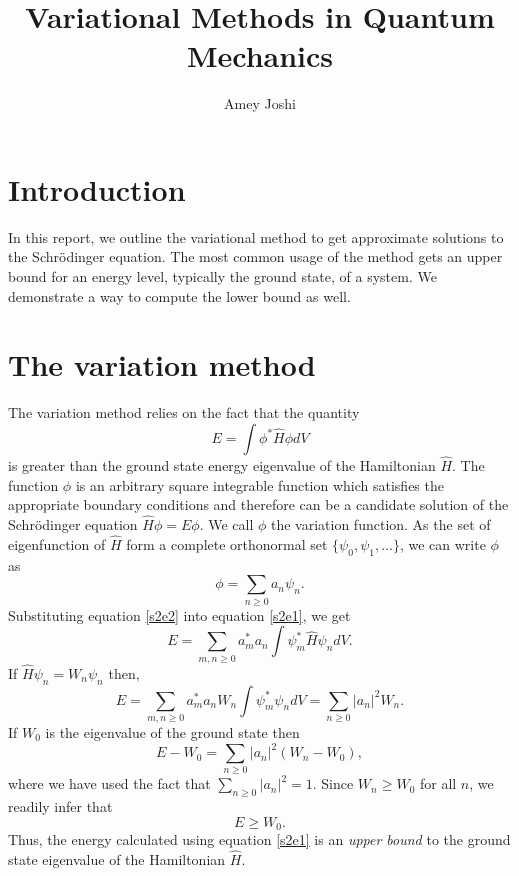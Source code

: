 \documentclass{article}
\numberwithin{equation}{section}
\begin{document}
\title{Variational Methods in Quantum Mechanics}
\author{Amey Joshi}
\maketitle
\section{Introduction}\label{s1}
In this report, we outline the variational method to get approximate 
solutions to the Schr\"{o}dinger equation. The most common usage of the
method gets an upper bound for an energy level, typically the ground 
state, of a system. We demonstrate a way to compute the lower bound as 
well.

\section{The variation method}\label{s2}
The variation method relies on the fact that the quantity
\begin{equation}\label{s2e1}
E = \int\phi^\ast\hat{H}\phi dV
\end{equation}
is greater than the ground state energy eigenvalue of the Hamiltonian 
$\hat{H}$. The function $\phi$ is an arbitrary square integrable function
which satisfies the appropriate boundary conditions and therefore can be 
a candidate solution of the Schr\"{o}dinger equation $\hat{H}\phi = E\phi$.
We call $\phi$ the variation function. As the set of eigenfunction of 
$\hat{H}$ form a complete orthonormal set $\{\psi_0, \psi_1, \ldots\}$, 
we can write $\phi$ as
\begin{equation}\label{s2e2}
\phi = \sum_{n \ge 0}a_n\psi_n.
\end{equation}
Substituting equation \eqref{s2e2} into equation \eqref{s2e1}, we get
\[
E = \sum_{m,n \ge 0}a_m^\ast a_n \int \psi_m^\ast \hat{H}\psi_n dV.
\]
If $\hat{H}\psi_n = W_n\psi_n$ then,
\[
E = \sum_{m,n \ge 0}a_m^\ast a_n W_n \int\psi_m^\ast\psi_n dV = 
\sum_{n \ge 0}|a_n|^2W_n.
\]
If $W_0$ is the eigenvalue of the ground state then
\begin{equation}\label{s2e3}
E - W_0 = \sum_{n \ge 0}|a_n|^2(W_n - W_0),
\end{equation}
where we have used the fact that $\sum_{n \ge 0}|a_n|^2 = 1$. Since 
$W_n \ge W_0$ for all $n$, we readily infer that
\begin{equation}\label{s2e4}
E \ge W_0.
\end{equation}
Thus, the energy calculated using equation \eqref{s2e1} is an 
\emph{upper bound} to the ground state eigenvalue of the Hamiltonian 
$\hat{H}$. 
\end{document}
